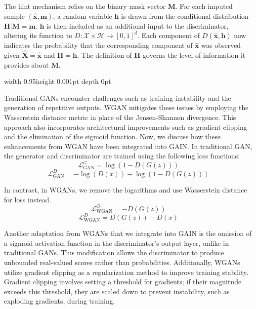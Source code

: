 The hint mechanism relies on the binary mask vector \( \mathbf{M} \). For each imputed sample \( (\hat{\mathbf{x}}, \mathbf{m}) \), a random variable \( \mathbf{h} \) is drawn from the conditional distribution \( \mathbf{H} | \mathbf{M} = \mathbf{m} \). \( \mathbf{h} \) is then included as an additional input to the discriminator, altering its function to \( D: \mathcal{X} \times \mathcal{H} \rightarrow [0, 1]^d \). Each component of \( D(\hat{\mathbf{x}}, \mathbf{h}) \) now indicates the probability that the corresponding component of \( \hat{\mathbf{x}} \) was observed given \( \hat{\mathbf{X}} = \hat{\mathbf{x}} \) and \( \mathbf{H} = \mathbf{h} \). The definition of \( \mathbf{H} \) governs the level of information it provides about \( \mathbf{M} \).




\textcolor{gray!80}{\vrule width 0.95\columnwidth height 0.001pt depth 0pt \relax}

\vspace{1ex}

Traditional GANs encounter challenges such as training instability and the generation of repetitive outputs. WGAN mitigates these issues by employing the Wasserstein distance metric in place of the Jensen-Shannon divergence. This approach also incorporates architectural improvements such as gradient clipping and the elimination of the sigmoid function. Now, we discuss how these enhancements from WGAN have been integrated into GAIN.
In traditional GAN, the generator and discriminator are trained using the following loss functions:
\[
\mathcal{L}_{\text{GAN}}^G = \log(1 - D(G(z)))
\]
\[
\mathcal{L}_{\text{GAN}}^D = -\log(D(x)) - \log(1 - D(G(z)))
\]

In contrast, in WGANs, we remove the logarithms and use Wasserstein distance for loss instead.
\[
\mathcal{L}_{\text{WGAN}}^G = -D(G(z))
\]
\[
\mathcal{L}_{\text{WGAN}}^D = D(G(z)) - D(x)
\]

Another adaptation from WGANs that we integrate into GAIN is the omission of a sigmoid activation function in the discriminator's output layer, unlike in traditional GANs. This modification allows the discriminator to produce unbounded real-valued scores rather than probabilities. Additionally, WGANs utilize gradient clipping as a regularization method to improve training stability. Gradient clipping involves setting a threshold for gradients; if their magnitude exceeds this threshold, they are scaled down to prevent instability, such as exploding gradients, during training.
